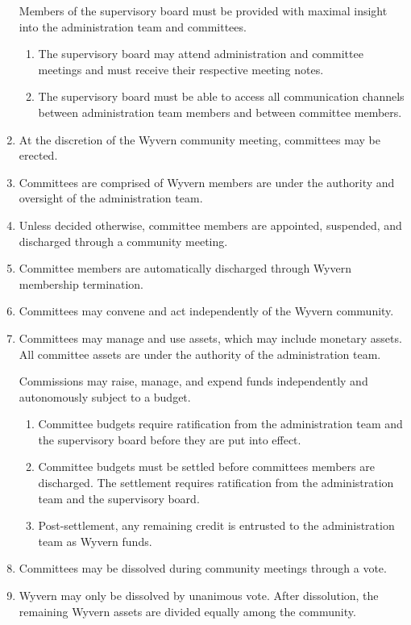 \begin{enumerate}
    \begin{item}
        Members of the supervisory board must be provided with maximal insight into the administration team and committees.
        \begin{enumerate}
            \item The supervisory board may attend administration and committee meetings and must receive their respective meeting notes.
            \item The supervisory board must be able to access all communication channels between administration team members and between committee members.
        \end{enumerate}
    \end{item}

    \item At the discretion of the Wyvern community meeting, committees may be erected.

    \item Committees are comprised of Wyvern members are under the authority and oversight of the administration team.

    \item Unless decided otherwise, committee members are appointed, suspended, and discharged through a community meeting.
    
    \item Committee members are automatically discharged through Wyvern membership termination.

    \item Committees may convene and act independently of the Wyvern community.

    \item Committees may manage and use assets, which may include monetary assets. All committee assets are under the authority of the administration team.

    \begin{item}
            Commissions may raise, manage, and expend funds independently and autonomously subject to a budget.
            \begin{enumerate}
                \item Committee budgets require ratification from the administration team and the supervisory board before they are put into effect.
                \item Committee budgets must be settled before committees members are discharged. The settlement requires ratification from the administration team and the supervisory board.
                \item Post-settlement, any remaining credit is entrusted to the administration team as Wyvern funds.
            \end{enumerate}
    \end{item}

    \item Committees may be dissolved during community meetings through a vote.

    \item Wyvern may only be dissolved by unanimous vote. After dissolution, the remaining Wyvern assets are divided equally among the community.

\end{enumerate}
